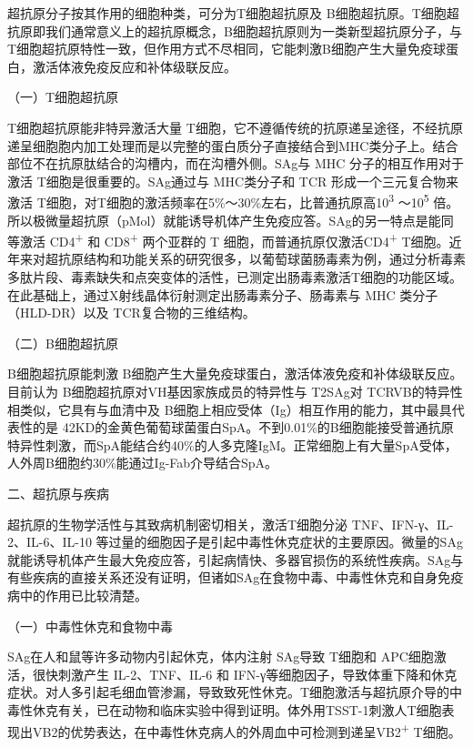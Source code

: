 超抗原分子按其作用的细胞种类，可分为T细胞超抗原及
B细胞超抗原。T细胞超抗原即我们通常意义上的超抗原概念，B细胞超抗原则为一类新型超抗原分子，与T细胞超抗原特性一致，但作用方式不尽相同，它能刺激B细胞产生大量免疫球蛋白，激活体液免疫反应和补体级联反应。

（一）T细胞超抗原

T细胞超抗原能非特异激活大量
T细胞，它不遵循传统的抗原递呈途径，不经抗原递呈细胞胞内加工处理而是以完整的蛋白质分子直接结合到MHC类分子上。结合部位不在抗原肽结合的沟槽内，而在沟槽外侧。SAg与
MHC 分子的相互作用对于激活 T细胞是很重要的。SAg通过与 MHC类分子和 TCR
形成一个三元复合物来激活
T细胞，对T细胞的激活频率在5\%～30\%左右，比普通抗原高10\textsuperscript{3}
～10\textsuperscript{5}
倍。所以极微量超抗原（pMol）就能诱导机体产生免疫应答。SAg的另一特点是能同等激活
CD4\textsuperscript{+} 和 CD8\textsuperscript{+} 两个亚群的 T
细胞，而普通抗原仅激活CD4\textsuperscript{+}
T细胞。近年来对超抗原结构和功能关系的研究很多，以葡萄球菌肠毒素为例，通过分析毒素多肽片段、毒素缺失和点突变体的活性，已测定出肠毒素激活T细胞的功能区域。
在此基础上，通过X射线晶体衍射测定出肠毒素分子、肠毒素与 MHC
类分子（HLD-DR）以及 TCR复合物的三维结构。

（二）B细胞超抗原

B细胞超抗原能刺激
B细胞产生大量免疫球蛋白，激活体液免疫和补体级联反应。目前认为
B细胞超抗原对VH基因家族成员的特异性与 T2SAg对
TCRVB的特异性相类似，它具有与血清中及
B细胞上相应受体（Ig）相互作用的能力，其中最具代表性的是
42KD的金黄色葡萄球菌蛋白SpA。不到0.01\%的B细胞能接受普通抗原特异性刺激，而SpA能结合约40\%的人多克隆IgM。正常细胞上有大量SpA受体，人外周B细胞约30\%能通过Ig-Fab介导结合SpA。

\begin{center}
    {\large 二、超抗原与疾病}
\end{center}

超抗原的生物学活性与其致病机制密切相关，激活T细胞分泌
TNF、IFN-γ、IL-2、IL-6、IL-10
等过量的细胞因子是引起中毒性休克症状的主要原因。微量的SAg就能诱导机体产生最大免疫应答，引起病情快、多器官损伤的系统性疾病。SAg与有些疾病的直接关系还没有证明，但诸如SAg在食物中毒、中毒性休克和自身免疫病中的作用已比较清楚。

（一）中毒性休克和食物中毒

SAg在人和鼠等许多动物内引起休克，体内注射 SAg导致 T细胞和
APC细胞激活，很快刺激产生 IL-2、TNF、IL-6 和
IFN-γ等细胞因子，导致体重下降和休克症状。对人多引起毛细血管渗漏，导致致死性休克。T细胞激活与超抗原介导的中毒性休克有关，已在动物和临床实验中得到证明。体外用TSST-1刺激人T细胞表现出VB2的优势表达，在中毒性休克病人的外周血中可检测到递呈VB2\textsuperscript{+}
T细胞。

